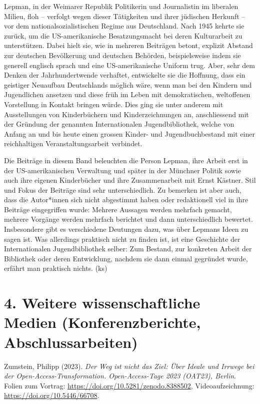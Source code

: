 \documentclass[a4paper,
fontsize=11pt,
oneside,
numbers=noperiodatend,
parskip=half-,
bibliography=totoc,
final
]{scrartcl}
\begin{document}
Lepman, in der Weimarer Republik Politikerin und Journalistin im
liberalen Milieu, floh -- verfolgt wegen dieser Tätigkeiten und ihrer
jüdischen Herkunft -- vor dem nationalsozialistischen Regime aus
Deutschland. Nach 1945 kehrte sie zurück, um die US-amerikanische
Besatzungsmacht bei deren Kulturarbeit zu unterstützen. Dabei hielt sie,
wie in mehreren Beiträgen betont, explizit Abstand zur deutschen
Bevölkerung und deutschen Behörden, beispielsweise indem sie generell
englisch sprach und eine US-amerikanische Uniform trug. Aber, sehr dem
Denken der Jahrhundertwende verhaftet, entwickelte sie die Hoffnung,
dass ein geistiger Neuaufbau Deutschlands möglich wäre, wenn man bei den
Kindern und Jugendlichen ansetzen und diese früh im Leben mit
demokratischen, weltoffenen Vorstellung in Kontakt bringen würde. Dies
ging sie unter anderem mit Ausstellungen von Kinderbüchern und
Kinderzeichnungen an, anschliessend mit der Gründung der genannten
Internationalen Jugendbibliothek, welche von Anfang an und bis heute
einen grossen Kinder- und Jugendbuchbestand mit einer reichhaltigen
Veranstaltungsarbeit verbindet.

Die Beiträge in diesem Band beleuchten die Person Lepman, ihre Arbeit
erst in der US-amerika\-nischen Verwaltung und später in der Münchner
Politik sowie auch ihre eigenen Kinderbücher und ihre Zusammenarbeit mit
Ernst Kästner. Stil und Fokus der Beiträge sind sehr unterschiedlich. Zu
bemerken ist aber auch, dass die Autor*innen sich nicht abgestimmt haben
oder redaktionell viel in ihre Beiträge eingegriffen wurde: Mehrere
Aussagen werden mehrfach gemacht, mehrere Vorgänge werden mehrfach
berichtet und dann unterschiedlich bewertet. Insbesondere gibt es
verschiedene Deutungen dazu, was über Lepmans Ideen zu sagen ist. Was
allerdings praktisch nicht zu finden ist, ist eine Geschichte der
Internationalen Jugendbibliothek selber: Zum Bestand, zur konkreten
Arbeit der Bibliothek oder deren Entwicklung, nachdem sie dann einmal
gegründet wurde, erfährt man praktisch nichts. (ks)

\hypertarget{weitere-wissenschaftliche-medien-konferenzberichte-abschlussarbeiten}{%
\section{4. Weitere wissenschaftliche Medien (Konferenzberichte,
Abschlussarbeiten)}\label{weitere-wissenschaftliche-medien-konferenzberichte-abschlussarbeiten}}

Zumstein, Philipp (2023). \emph{Der Weg ist nicht das Ziel: Über Ideale
und Irrwege bei der Open-Access-Transformation. Open-Access-Tage 2023
(OAT23), Berlin}. Folien zum Vortrag:
\url{https://doi.org/10.5281/zenodo.8388502}, Videoaufzeichnung:
\url{https://doi.org/10.5446/66708}.
\end{document}
